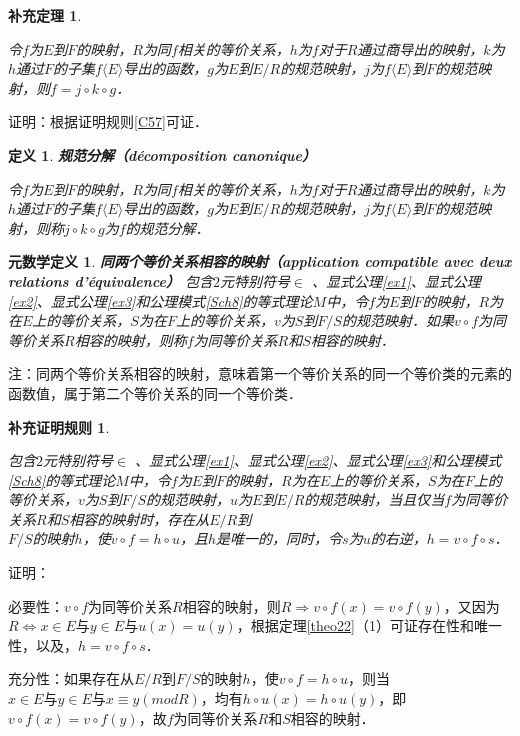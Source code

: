 \documentclass[12pt, a4paper, oneside]{book}
\newtheorem{metadef}{元数学定义}
\newtheorem{Ccor}{补充证明规则}
\newtheorem{cor}{补充定理}
\newtheorem{de}{定义}
\begin{document}
			\begin{cor}\label{cor152}
				\hfill\par
				令$f$为$E$到$F$的映射，$R$为同$f$相关的等价关系，$h$为$f$对于$R$通过商导出的映射，$k$为$h$通过$F$的子集$f\langle E \rangle $导出的函数，$g$为$E$到$E/R$的规范映射，$j$为$f\langle E \rangle $到$F$的规范映射，则$f=j\circ k\circ g$．
			\end{cor}
			证明：根据证明规则\ref{C57}可证．

			\begin{de}
				\textbf{规范分解（décomposition canonique）}
				\par
				令$f$为$E$到$F$的映射，$R$为同$f$相关的等价关系，$h$为$f$对于$R$通过商导出的映射，$k$为$h$通过$F$的子集$f\langle E \rangle $导出的函数，$g$为$E$到$E/R$的规范映射，$j$为$f\langle E \rangle $到$F$的规范映射，则称$j\circ k\circ g$为$f$的规范分解．
			\end{de}

			\begin{metadef}
				\textbf{同两个等价关系相容的映射（application compatible avec deux relations d'équivalence）}
				包含$2$元特别符号$\in$ 、显式公理\ref{ex1}、显式公理\ref{ex2}、显式公理\ref{ex3}和公理模式\ref{Sch8}的等式理论$M$中，令$f$为$E$到$F$的映射，$R$为在$E$上的等价关系，$S$为在$F$上的等价关系，$v$为$S$到$F/S$的规范映射．如果$v\circ f$为同等价关系$R$相容的映射，则称$f$为同等价关系$R$和$S$相容的映射．
			\end{metadef}
			注：同两个等价关系相容的映射，意味着第一个等价关系的同一个等价类的元素的函数值，属于第二个等价关系的同一个等价类．

			\begin{Ccor}\label{Ccor49}
				\hfill\par
				包含$2$元特别符号$\in$ 、显式公理\ref{ex1}、显式公理\ref{ex2}、显式公理\ref{ex3}和公理模式\ref{Sch8}的等式理论$M$中，令$f$为$E$到$F$的映射，$R$为在$E$上的等价关系，$S$为在$F$上的等价关系，$v$为$S$到$F/S$的规范映射，$u$为$E$到$E/R$的规范映射，当且仅当$f$为同等价关系$R$和$S$相容的映射时，存在从$E/R$到\\$F/S$的映射$h$，使$v\circ f=h\circ u$，且$h$是唯一的，同时，令$s$为$u$的右逆，$h=v\circ f\circ s$．
			\end{Ccor}
			证明：
			\par
			必要性：$v\circ f$为同等价关系$R$相容的映射，则$R\Rightarrow v\circ f (x)= v\circ f (y)$，又因为$R\Leftrightarrow x\in E\text{与}y\in E\text{与}u(x)=u(y)$，根据定理\ref{theo22}（1）可证存在性和唯一性，以及，$h=v\circ f\circ s$．
			\par
			充分性：如果存在从$E/R$到$F/S$的映射$h$，使$v\circ f=h\circ u$，则当$x\in E\text{与}y\in E\text{与}x\equiv y(mod R)$，均有$h\circ u(x)=h\circ u(y)$，即$v\circ f(x)=v\circ f(y)$，故$f$为同等价关系$R$和$S$相容的映射．
\end{document}
